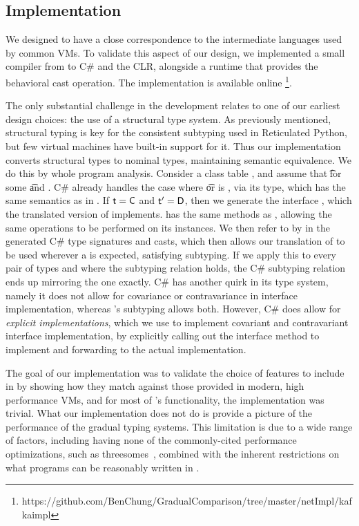 \documentclass[runnningheads]{tex/llncs}
\begin{document}
\subsection{Implementation}

We designed \kafka to have a close correspondence to the intermediate
languages used by common VMs. To validate this aspect of our design, we
implemented a small compiler from \kafka to C\# and the CLR, alongside a
runtime that provides the behavioral cast operation. The implementation is
available online \footnote{https://github.com/BenChung/GradualComparison/tree/master/netImpl/kafkaimpl}.

The only substantial challenge in the development relates to one of our earliest design
choices: the use of a structural type system. As previously mentioned,
structural typing is key for the consistent subtyping used in Reticulated
Python, but few virtual machines have built-in support for it. Thus our
implementation converts structural types to nominal types, maintaining
semantic equivalence.  We do this by whole program analysis. Consider a
class table \K, and assume that \StrSub{}\K\t\tp for some \t and \tp. C\#
already handles the case where \t or \tp is \any, via its  type,
which has the same semantics as \any in \kafka. If $\t=\C$ and $\tp=\D$,
then we generate the interface , which the translated version of \C
implements.  has the same methods as \D, allowing the same operations
to be performed on its instances. We then refer to \D by  in the
generated C\# type signatures and casts, which then allows our translation
of \C to be used wherever a \D is expected, satisfying subtyping. If we
apply this to every pair of types \C and \D where the subtyping relation
holds, the C\# subtyping relation ends up mirroring the \kafka one exactly.
C\# has another quirk in its type system, namely it does not allow for
covariance or contravariance in interface implementation, whereas \kafka's
subtyping allows both. However, C\# does allow for \emph{explicit
  implementations}, which we use to implement covariant and contravariant
interface implementation, by explicitly calling out the interface method to
implement and forwarding to the actual implementation.

The goal of our implementation was to validate the choice of features to
include in \kafka by showing how they match against those provided in modern, high
performance VMs, and for most of \kafka's functionality, the implementation
was trivial. What our implementation does not do is provide a picture of the
performance of the gradual typing systems. This limitation is due to a wide
range of factors, including having none of the commonly-cited performance
optimizations, such as threesomes~\cite{siek10}, combined with the inherent
restrictions on what programs can be reasonably written in \kafka.
\end{document}
